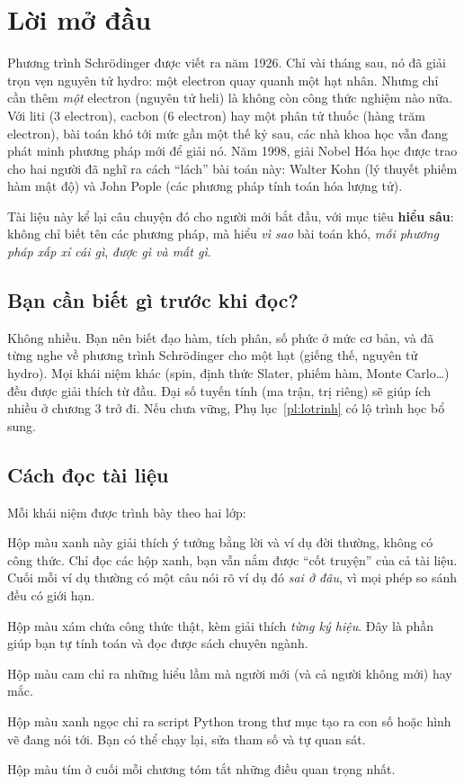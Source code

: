 \chapter*{Lời mở đầu}

Phương trình Schrödinger được viết ra năm 1926. Chỉ vài tháng sau, nó đã giải trọn vẹn nguyên tử hydro: một electron quay quanh một hạt nhân. Nhưng chỉ cần thêm \emph{một} electron (nguyên tử heli) là không còn công thức nghiệm nào nữa. Với liti (3 electron), cacbon (6 electron) hay một phân tử thuốc (hàng trăm electron), bài toán khó tới mức gần một thế kỷ sau, các nhà khoa học vẫn đang phát minh phương pháp mới để giải nó. Năm 1998, giải Nobel Hóa học được trao cho hai người đã nghĩ ra cách ``lách'' bài toán này: Walter Kohn (lý thuyết phiếm hàm mật độ) và John Pople (các phương pháp tính toán hóa lượng tử).

Tài liệu này kể lại câu chuyện đó cho người mới bắt đầu, với mục tiêu \textbf{hiểu sâu}: không chỉ biết tên các phương pháp, mà hiểu \emph{vì sao} bài toán khó, \emph{mỗi phương pháp xấp xỉ cái gì}, \emph{được gì và mất gì}.

\section*{Bạn cần biết gì trước khi đọc?}
Không nhiều. Bạn nên biết đạo hàm, tích phân, số phức ở mức cơ bản, và đã từng nghe về phương trình Schrödinger cho một hạt (giếng thế, nguyên tử hydro). Mọi khái niệm khác (spin, định thức Slater, phiếm hàm, Monte Carlo\ldots) đều được giải thích từ đầu. Đại số tuyến tính (ma trận, trị riêng) sẽ giúp ích nhiều ở chương 3 trở đi. Nếu chưa vững, Phụ lục~\ref{pl:lotrinh} có lộ trình học bổ sung.

\section*{Cách đọc tài liệu}
Mỗi khái niệm được trình bày theo hai lớp:
\begin{eli5}
Hộp màu xanh này giải thích ý tưởng bằng lời và ví dụ đời thường, không có công thức. Chỉ đọc các hộp xanh, bạn vẫn nắm được ``cốt truyện'' của cả tài liệu. Cuối mỗi ví dụ thường có một câu nói rõ ví dụ đó \emph{sai ở đâu}, vì mọi phép so sánh đều có giới hạn.
\end{eli5}
\begin{congthuc}
Hộp màu xám chứa công thức thật, kèm giải thích \emph{từng ký hiệu}. Đây là phần giúp bạn tự tính toán và đọc được sách chuyên ngành.
\end{congthuc}
\begin{hieulam}
Hộp màu cam chỉ ra những hiểu lầm mà người mới (và cả người không mới) hay mắc.
\end{hieulam}
\begin{chaycode}
Hộp màu xanh ngọc chỉ ra script Python trong thư mục  tạo ra con số hoặc hình vẽ đang nói tới. Bạn có thể chạy lại, sửa tham số và tự quan sát.
\end{chaycode}
\begin{ghinho}
Hộp màu tím ở cuối mỗi chương tóm tắt những điều quan trọng nhất.
\end{ghinho}

